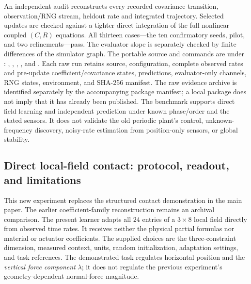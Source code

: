 \documentclass[journal]{IEEEtran}
\begin{document}
An independent audit reconstructs every recorded covariance transition,
observation/RNG stream, heldout rate and integrated trajectory. Selected
updates are checked against a tighter direct integration of the full
nonlinear coupled $(C,R)$ equations. All thirteen cases---the ten
confirmatory seeds, pilot, and two refinements---pass. The evaluator slope
is separately checked by finite differences of the simulator graph.
The portable source and commands are under
: ,
, , , and
. Each raw run retains source, configuration, complete
observed rates and pre-update coefficient/covariance states, predictions,
evaluator-only channels, RNG states, environment, and SHA-256 manifest.
The raw evidence archive is identified separately by the accompanying package manifest;
a local package does not imply that it has already been published.
The benchmark supports direct field learning and independent prediction
under known phase/order and the stated sensors. It does not validate the
old periodic plant's control, unknown-frequency discovery, noisy-rate
estimation from position-only sensors, or global stability.
%
\subsection{Direct local-field contact: protocol, readout, and limitations}
\label{sec:direct_contact_protocol}
This new experiment replaces the structured contact demonstration in the main
paper. The earlier coefficient-family reconstruction remains an archival
comparison. The present learner adapts all $24$ entries of a $3\times8$ local
field directly from observed time rates. It receives neither the physical
partial formulas nor material or actuator coefficients. The supplied choices
are the three-constraint dimension, measured context, units, random
initialization, adaptation settings, and task references. The demonstrated
task regulates horizontal position and the \emph{vertical force component}
$\lambda$; it does not regulate the previous experiment's geometry-dependent
normal-force magnitude.
\end{document}

